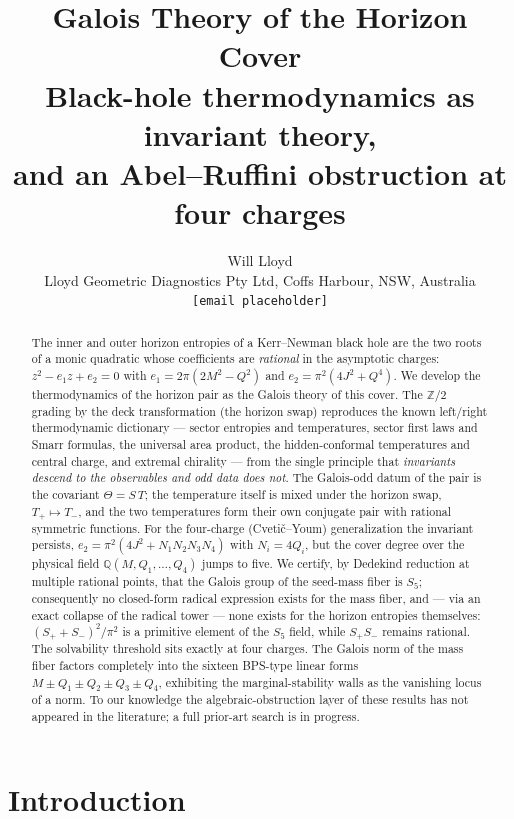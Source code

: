 \documentclass[11pt]{article}
\title{\textbf{Galois Theory of the Horizon Cover}\\[4pt]
\large Black-hole thermodynamics as invariant theory,\\
and an Abel--Ruffini obstruction at four charges\\[6pt]
\normalsize\fbox{DRAFT v0.2 --- 10 July 2026 --- not for distribution}}
\author{Will Lloyd\\
\small Lloyd Geometric Diagnostics Pty Ltd, Coffs Harbour, NSW, Australia\\
\small \texttt{[email placeholder]}}
\date{}
\theoremstyle{definition}
\theoremstyle{remark}
\newcommand{\Q}{\mathbb{Q}}
\newcommand{\ZZ}{\mathbb{Z}}
\begin{document}
\maketitle

\begin{abstract}
The inner and outer horizon entropies of a Kerr--Newman black hole are the two
roots of a monic quadratic whose coefficients are \emph{rational} in the
asymptotic charges: $z^2-e_1 z+e_2=0$ with $e_1=2\pi(2M^2-Q^2)$ and
$e_2=\pi^2(4J^2+Q^4)$. We develop the thermodynamics of the horizon pair as the
Galois theory of this cover. The $\ZZ/2$ grading by the deck transformation
(the horizon swap) reproduces the known left/right thermodynamic dictionary
--- sector entropies and temperatures, sector first laws and Smarr formulas,
the universal area product, the hidden-conformal temperatures and central
charge, and extremal chirality --- from the single principle that
\emph{invariants descend to the observables and odd data does not}. The
Galois-odd datum of the pair is the covariant $\Theta=S\,T$; the temperature
itself is mixed under the horizon swap, $T_+\mapsto T_-$, and the two
temperatures form their own conjugate pair with rational symmetric functions. For the four-charge
(Cveti\v{c}--Youm) generalization the invariant persists,
$e_2=\pi^2\!\left(4J^2+N_1N_2N_3N_4\right)$ with $N_i=4Q_i$, but the cover
degree over the physical field $\Q(M,Q_1,\dots,Q_4)$ jumps to five. We certify,
by Dedekind reduction at multiple rational points, that the Galois group of the
seed-mass fiber is $S_5$; consequently no closed-form radical expression exists
for the mass fiber, and --- via an exact collapse of the radical tower --- none
exists for the horizon entropies themselves: $(S_++S_-)^2/\pi^2$ is a primitive
element of the $S_5$ field, while $S_+S_-$ remains rational. The solvability
threshold sits exactly at four charges. The Galois norm of the mass fiber
factors completely into the sixteen BPS-type linear forms
$M\pm Q_1\pm Q_2\pm Q_3\pm Q_4$, exhibiting the marginal-stability walls as
the vanishing locus of a norm. To our knowledge the algebraic-obstruction layer
of these results has not appeared in the literature; a full prior-art search is
in progress.
\end{abstract}

\section{Introduction}
\end{document}
